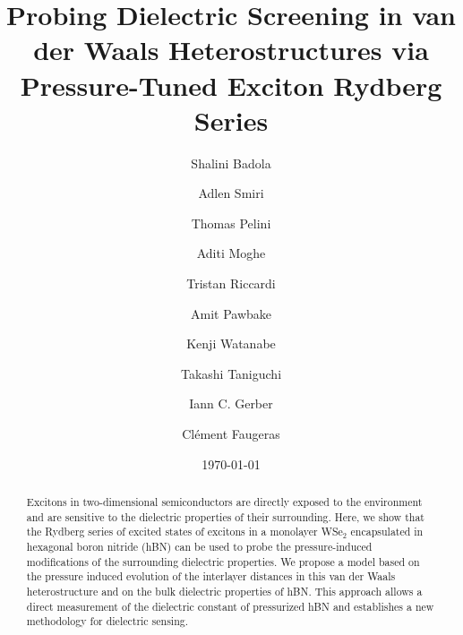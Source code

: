 \documentclass[twocolumn,showpacs,preprintnumbers,prl,fleqn,superscriptaddress]{revtex4-2}
\begin{document}
\title{Probing Dielectric Screening in van der Waals Heterostructures via Pressure-Tuned Exciton Rydberg Series}

\author{Shalini Badola}
\author{Adlen Smiri}
\author{Thomas Pelini}
\author{Aditi Moghe}
\author{Tristan Riccardi}
\author{Amit Pawbake}
\author{Kenji Watanabe}
\author{Takashi Taniguchi}
\author{Iann C. Gerber}
\author{Cl\'ement Faugeras}



\date{\today }

\begin{abstract}

Excitons in two-dimensional semiconductors are directly exposed to the environment and are sensitive to the dielectric properties of their surrounding. Here, we show that the Rydberg series of excited states of excitons in a monolayer WSe$_2$ encapsulated in hexagonal boron nitride (hBN) can be used to probe the pressure-induced modifications of the surrounding dielectric properties. We propose a model based on the pressure induced evolution of the interlayer distances in this van der Waals heterostructure and on the bulk dielectric properties of hBN. This approach allows a direct measurement of the dielectric constant of pressurized hBN and establishes a new methodology for dielectric sensing.

\end{abstract}


\maketitle
\end{document}
